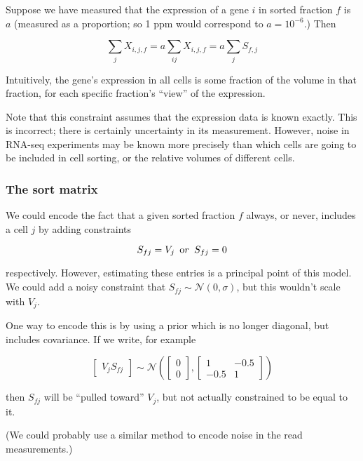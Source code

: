 \documentclass{article}
\begin{document}
Suppose we have measured that the expression of a gene $i$ in sorted
fraction $f$ is $a$ (measured as a proportion; so 1 ppm would correspond
to $a = 10^{-6}$.) Then

\[
\sum_j X_{i,j,f} = a \sum_{ij} X_{i,j,f} = a \sum_{j} S_{f,j}
\]

Intuitively, the gene's expression in all cells is some fraction of
the volume in that fraction, for each specific fraction's ``view'' of the expression.

Note that this constraint assumes that the expression data
is known exactly. This is incorrect; there is certainly
uncertainty in its measurement. However, noise in RNA-seq experiments
may be known more precisely than which cells are going to be
included in cell sorting, or the relative volumes of
different cells.

\subsubsection{The sort matrix}

We could encode the fact that a given sorted fraction $f$ always,
or never,
includes a cell $j$ by adding constraints

\[
S_{fj} = V_j \hspace{5pt} {\textrm or} \hspace{5pt} S_{fj} = 0
\]

respectively. However, estimating these entries is a principal point
of this model. We could add a noisy constraint that
$S_{fj} \sim \mathcal{N}(0, \sigma)$, but this wouldn't scale with $V_j$.


One way to encode this is by using a prior which is no longer diagonal,
but includes covariance. If we write, for example

\[
\begin{bmatrix}
V_j
S_{fj}
\end{bmatrix}
\sim \mathcal{N}(
\begin{bmatrix}
0 \\
0
\end{bmatrix}
,
\begin{bmatrix}
1 & -0.5 \\
-0.5 & 1 
\end{bmatrix}
)
\]

then $S_{fj}$ will be ``pulled toward'' $V_j$, but not actually
constrained to be equal to it.

(We could probably use a similar method to encode noise in the
read measurements.)
\end{document}
